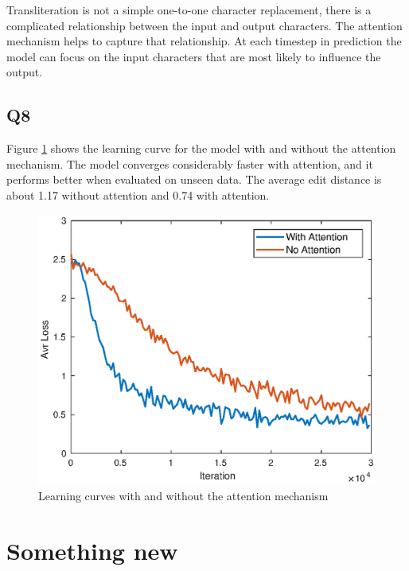 \documentclass[12pt]{article}
\begin{document}
Transliteration is not a simple one-to-one character replacement, there is a complicated relationship between the input and output characters. The attention mechanism helps to capture that relationship. At each timestep in prediction the model can focus on the input characters that are most likely to influence the output.


\subsection{Q8}

Figure \ref{fig_attention} shows the learning curve for the model with and without the attention mechanism. The model converges considerably faster with attention, and it performs better when evaluated on unseen data. The average edit distance is about 1.17 without attention and 0.74 with attention.

\begin{figure}[h]
    \centering
    \includegraphics[width=\linewidth]{img/attention6.eps}
    \caption{Learning curves with and without the attention mechanism}
    \label{fig_attention}
\end{figure}



\section{Something new}
\end{document}
